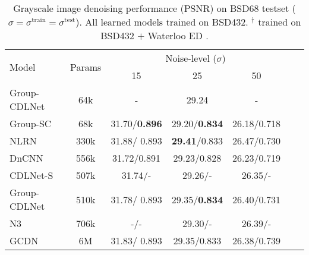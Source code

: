\documentclass[12pt,a4paper,leqno]{amsart}
\begin{document}
\begin{table}
\centering
\caption{Grayscale image denoising performance (PSNR) on BSD68 testset ($\sigma
= \sigma^{\mathrm{train}} = \sigma^{\mathrm{test}}$). All learned models
trained on BSD432\cite{bsd}. $^\dagger$ trained on BSD432 $+$ Waterloo ED
\cite{ma2017waterloo}.}
\begin{tabular}{lcccccc} \hline
\multirow{2}{*}{Model} & \multirow{2}{*}{Params} & \multicolumn{3}{c}{Noise-level ($\sigma$)} \\
 & & 15 & 25 & 50 \\ \hline
Group-CDLNet & 64k & - & 29.24 &  - \\
Group-SC     & 68k & 31.70/{\bf 0.896} & 29.20/{\bf 0.834} & 26.18/0.718 \\ 
NLRN         & 330k & { 31.88}/{ 0.893} & {\bf 29.41}/0.833 & 26.47/0.730 \\
DnCNN        & 556k & 31.72/0.891 & 29.23/0.828 & 26.23/0.719 \\
CDLNet-S & 507k& 31.74/- & 29.26/- & 26.35/- \\
Group-CDLNet & 510k & 31.78/{ 0.893} & 29.35/{\bf 0.834} & 26.40/0.731 \\
N3 & 706k & -/- & 29.30/- & 26.39/- \\
GCDN & 6M & 31.83/{ 0.893} & 29.35/0.833 & 26.38/0.739 \\\hline
\end{tabular}
\end{table}
\end{document}
